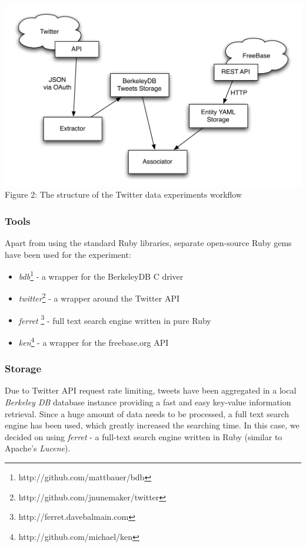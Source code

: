 \begin{center}
  \includegraphics[scale=0.65]{images/twitter_diagram.pdf} \\
  Figure 2: The structure of the Twitter data experiments workflow
\end{center}

\subsubsection{Tools}
Apart from using the standard Ruby libraries, separate open-source Ruby gems have been used for the experiment:
\begin{itemize}
  \item \textit{bdb}\footnote{http://github.com/mattbauer/bdb} - a wrapper for the BerkeleyDB C driver
  \item \textit{twitter}\footnote{http://github.com/jnunemaker/twitter} - a wrapper around the Twitter API
  \item \textit{ferret} \footnote{http://ferret.davebalmain.com} - full text search engine written in pure Ruby
  \item \textit{ken}\footnote{http://github.com/michael/ken} - a wrapper for the freebase.org API
\end{itemize}

\subsubsection{Storage}
Due to Twitter API request rate limiting, tweets have been aggregated in a local
\textit{Berkeley DB} database instance providing a fast and easy key-value
information retrieval. Since a huge amount of data needs to be processed, a full
text search engine has been used, which greatly increased the searching time. In
this case, we decided on using \textit{ferret} - a full-text search engine
written in Ruby (similar to Apache's \textit{Lucene}).

